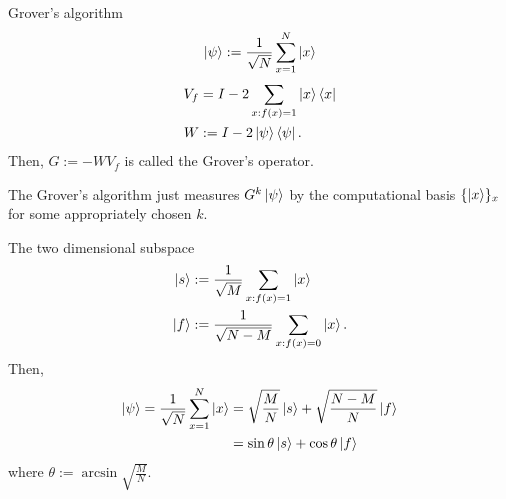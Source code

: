 \documentclass{beamer}
\newcommand\emm[1]{\textcolor{redorange}{{#1}}}
\begin{document}
\begin{frame}{Grover's algorithm}
\begin{align*}
\ket{\psi} := \frac1{\sqrt{N}} \sum_{x=1}^N \ket{x}
\end{align*}
\begin{align*}
V_f  &= I - 2 \sum_{x: f(x) = 1}\ket{x}\bra{x}\\
W    &:= I - 2 \ket{\psi}\bra{\psi}.
\end{align*}
Then, $G:=-WV_f$ is called the Grover's operator.

\vspace{2em}
The Grover's algorithm just measures \emm{$G^k\ket{\psi}$} by the computational basis $\{\ket{x}\}_x$ for some \emm{appropriately chosen} $k$.
\end{frame}



\begin{frame}{The two dimensional subspace}
\begin{align*}
\ket{s} &:= \frac1{\sqrt{M}}\sum_{x: f(x) = 1} \ket{x}\\
\ket{f} &:= \frac1{\sqrt{N-M}}\sum_{x: f(x) = 0} \ket{x}.
\end{align*}
Then,
\begin{align*}
\ket{\psi} = \frac1{\sqrt{N}} \sum_{x=1}^N \ket{x}
&= \sqrt{\frac{M}{N}} \ket{s} + \sqrt{\frac{N-M}{N}} \ket{f}\\
&= \sin\theta\ket{s} + \cos\theta\ket{f}
\end{align*}
where $\theta:=\arcsin\sqrt{\frac{M}{N}}$.
\end{frame}
\end{document}
